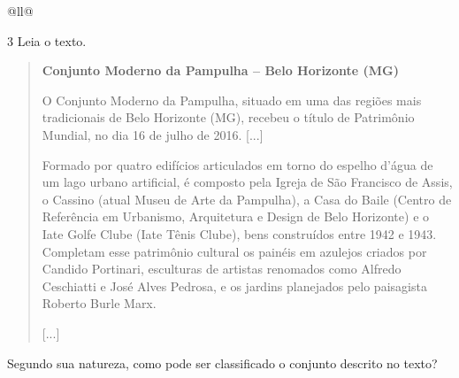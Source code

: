 \begin{itemize}
\begin{itemize}
\begin{escolha}[]{@{}ll@{}}
\begin{escolha}
\begin{quote}
\end{quote}

\end{escolha}


\num{3} Leia o texto.

\begin{quote}
\textbf{Conjunto Moderno da Pampulha -- Belo Horizonte (MG)}

O Conjunto Moderno da Pampulha, situado em uma das regiões mais
tradicionais de Belo Horizonte (MG), recebeu o título de Patrimônio
Mundial, no dia 16 de julho de 2016. {[}...{]}

Formado por quatro edifícios articulados em torno do espelho d'água de
um lago urbano artificial, é composto pela Igreja de São Francisco de
Assis, o Cassino (atual Museu de Arte da Pampulha), a Casa do Baile
(Centro de Referência em Urbanismo, Arquitetura e Design de Belo
Horizonte) e o Iate Golfe Clube (Iate Tênis Clube), bens construídos
entre 1942 e 1943. Completam esse patrimônio cultural os painéis em
azulejos criados por Candido Portinari, esculturas de artistas renomados
como Alfredo Ceschiatti e José Alves Pedrosa, e os jardins planejados
pelo paisagista Roberto Burle Marx.

{[}...{]}

\end{quote}

Segundo sua natureza, como pode ser classificado o conjunto descrito no texto?


\end{escolha}
\end{itemize}
\end{itemize}
